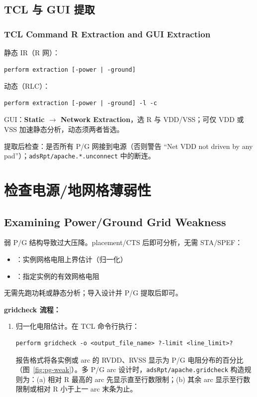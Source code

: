 \subsection{TCL 与 GUI 提取}
\subsubsection*{TCL Command R Extraction and GUI Extraction}

静态 IR（R 网）：
\begin{lstlisting}
perform extraction [-power | -ground]
\end{lstlisting}

动态（RLC）：
\begin{lstlisting}
perform extraction [-power | -ground] -l -c
\end{lstlisting}

GUI：\textbf{Static $\rightarrow$ Network Extraction}，选 R 与 VDD/VSS；可仅 VDD 或 VSS 加速静态分析，动态须两者皆选。

提取后检查：是否所有 P/G 网接到电源（否则警告 ``Net VDD not driven by any pad''）；\texttt{adsRpt/apache.*.unconnect} 中的断连。

\section{检查电源/地网格薄弱性}
\subsection*{Examining Power/Ground Grid Weakness}

弱 P/G 结构导致过大压降。placement/CTS 后即可分析，无需 STA/SPEF：
\begin{itemize}
  \item {}：实例网格电阻上界估计（归一化）
  \item {}：指定实例的有效网格电阻
\end{itemize}

无需先跑功耗或静态分析；导入设计并 P/G 提取后即可。

\textbf{gridcheck 流程：}
\begin{enumerate}
  \item 归一化电阻估计。在 TCL 命令行执行：
\begin{lstlisting}
perform gridcheck -o <output_file_name> ?-limit <line_limit>?
\end{lstlisting}
  报告格式将各实例或 arc 的 RVDD、RVSS 显示为 P/G 电阻分布的百分比（图~\ref{fig:pg-weak}）。多 P/G arc 设计时，\texttt{adsRpt/apache.gridcheck} 构造规则为：(a) 相对 R 最高的 arc 先显示直至行数限制；(b) 其余 arc 显示至行数限制或相对 R 小于上一 arc 末条为止。
\end{enumerate}

